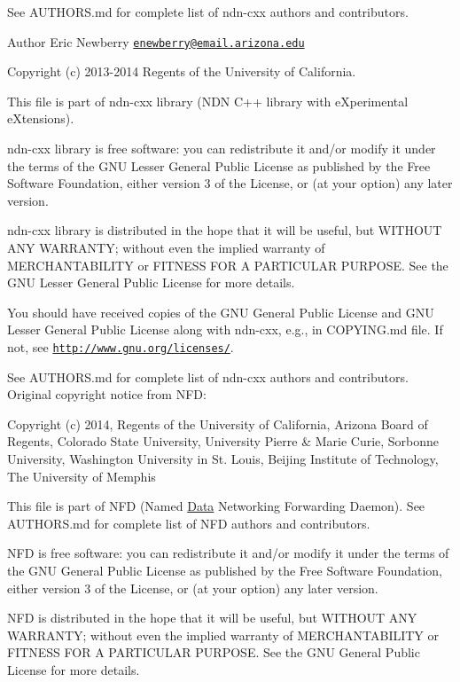 See A\+U\+T\+H\+O\+R\+S.\+md for complete list of ndn-\/cxx authors and contributors.

\begin{DoxyAuthor}{Author}
Eric Newberry \href{mailto:enewberry@email.arizona.edu}{\tt enewberry@email.\+arizona.\+edu}
\end{DoxyAuthor}
Copyright (c) 2013-\/2014 Regents of the University of California.

This file is part of ndn-\/cxx library (N\+DN C++ library with e\+Xperimental e\+Xtensions).

ndn-\/cxx library is free software\+: you can redistribute it and/or modify it under the terms of the G\+NU Lesser General Public License as published by the Free Software Foundation, either version 3 of the License, or (at your option) any later version.

ndn-\/cxx library is distributed in the hope that it will be useful, but W\+I\+T\+H\+O\+UT A\+NY W\+A\+R\+R\+A\+N\+TY; without even the implied warranty of M\+E\+R\+C\+H\+A\+N\+T\+A\+B\+I\+L\+I\+TY or F\+I\+T\+N\+E\+SS F\+OR A P\+A\+R\+T\+I\+C\+U\+L\+AR P\+U\+R\+P\+O\+SE. See the G\+NU Lesser General Public License for more details.

You should have received copies of the G\+NU General Public License and G\+NU Lesser General Public License along with ndn-\/cxx, e.\+g., in C\+O\+P\+Y\+I\+N\+G.\+md file. If not, see \href{http://www.gnu.org/licenses/}{\tt http\+://www.\+gnu.\+org/licenses/}.

See A\+U\+T\+H\+O\+R\+S.\+md for complete list of ndn-\/cxx authors and contributors. Original copyright notice from N\+FD\+:

Copyright (c) 2014, Regents of the University of California, Arizona Board of Regents, Colorado State University, University Pierre \& Marie Curie, Sorbonne University, Washington University in St. Louis, Beijing Institute of Technology, The University of Memphis

This file is part of N\+FD (Named \hyperlink{classndn_1_1Data}{Data} Networking Forwarding Daemon). See A\+U\+T\+H\+O\+R\+S.\+md for complete list of N\+FD authors and contributors.

N\+FD is free software\+: you can redistribute it and/or modify it under the terms of the G\+NU General Public License as published by the Free Software Foundation, either version 3 of the License, or (at your option) any later version.

N\+FD is distributed in the hope that it will be useful, but W\+I\+T\+H\+O\+UT A\+NY W\+A\+R\+R\+A\+N\+TY; without even the implied warranty of M\+E\+R\+C\+H\+A\+N\+T\+A\+B\+I\+L\+I\+TY or F\+I\+T\+N\+E\+SS F\+OR A P\+A\+R\+T\+I\+C\+U\+L\+AR P\+U\+R\+P\+O\+SE. See the G\+NU General Public License for more details.

